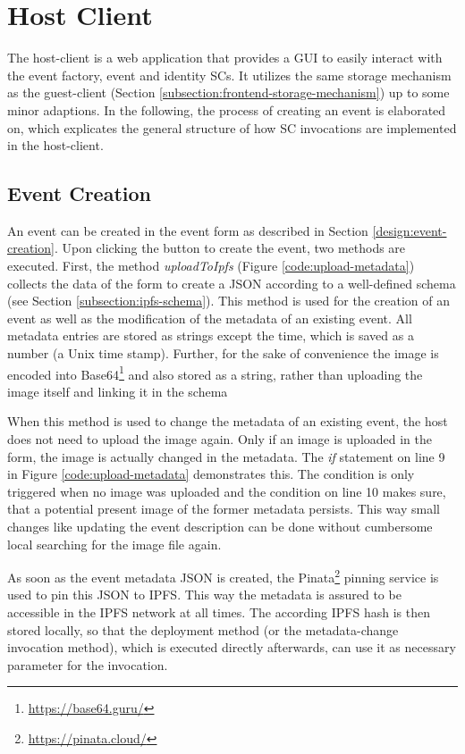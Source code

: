 \section{Host Client}
The host-client is a web application that provides a GUI to easily interact with the event factory, event and identity SCs. It utilizes the same storage mechanism as the guest-client (Section \ref{subsection:frontend-storage-mechanism}) up to some minor adaptions. In the following, the process of creating an event is elaborated on, which explicates the general structure of how SC invocations are implemented in the host-client.

\subsection{Event Creation}
An event can be created in the event form as described in Section \ref{design:event-creation}. Upon clicking the button to create the event, two methods are executed. First, the method \textit{uploadToIpfs} (Figure \ref{code:upload-metadata}) collects the data of the form to create a JSON according to a well-defined schema (see Section \ref{subsection:ipfs-schema}). This method is used for the creation of an event as well as the modification of the metadata of an existing event. All metadata entries are stored as strings except the time, which is saved as a number (a Unix time stamp). Further, for the sake of convenience the image is encoded into Base64\footnote{\href{https://base64.guru/}{https://base64.guru/}} and also stored as a string, rather than uploading the image itself and linking it in the schema

When this method is used to change the metadata of an existing event, the host does not need to upload the image again. Only if an image is uploaded in the form, the image is actually changed in the metadata. The \textit{if} statement on line 9 in Figure \ref{code:upload-metadata} demonstrates this. The condition is only triggered when no image was uploaded and the condition on line 10 makes sure, that a potential present image of the former metadata persists. This way small changes like updating the event description can be done without cumbersome local searching for the image file again.

As soon as the event metadata JSON is created, the Pinata\footnote{\href{https://pinata.cloud/}{https://pinata.cloud/}} pinning service is used to pin this JSON to IPFS. This way the metadata is assured to be accessible in the IPFS network at all times. The according IPFS hash is then stored locally, so that the deployment method (or the metadata-change invocation method), which is executed directly afterwards, can use it as necessary parameter for the invocation.

